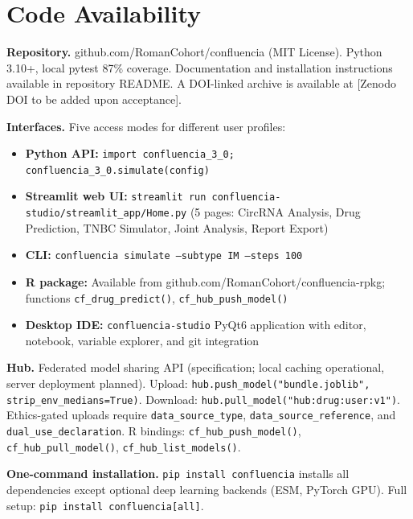 \documentclass[11pt,a4paper]{article}
\begin{document}
\section{Code Availability}

\textbf{Repository.} github.com/RomanCohort/confluencia (MIT License). Python 3.10+, local pytest 87\% coverage. Documentation and installation instructions available in repository README. A DOI-linked archive is available at [Zenodo DOI to be added upon acceptance].

\textbf{Interfaces.} Five access modes for different user profiles:
\begin{itemize}
\item \textbf{Python API:} \texttt{import confluencia\_3\_0; confluencia\_3\_0.simulate(config)}
\item \textbf{Streamlit web UI:} \texttt{streamlit run confluencia-studio/streamlit\_app/Home.py} (5 pages: CircRNA Analysis, Drug Prediction, TNBC Simulator, Joint Analysis, Report Export)
\item \textbf{CLI:} \texttt{confluencia simulate --subtype IM --steps 100}
\item \textbf{R package:} Available from github.com/RomanCohort/confluencia-rpkg; functions \texttt{cf\_drug\_predict()}, \texttt{cf\_hub\_push\_model()}
\item \textbf{Desktop IDE:} \texttt{confluencia-studio} PyQt6 application with editor, notebook, variable explorer, and git integration
\end{itemize}

\textbf{Hub.} Federated model sharing API (specification; local caching operational, server deployment planned). Upload: \texttt{hub.push\_model("bundle.joblib", strip\_env\_medians=True)}. Download: \texttt{hub.pull\_model("hub:drug:user:v1")}. Ethics-gated uploads require \texttt{data\_source\_type}, \texttt{data\_source\_reference}, and \texttt{dual\_use\_declaration}. R bindings: \texttt{cf\_hub\_push\_model()}, \texttt{cf\_hub\_pull\_model()}, \texttt{cf\_hub\_list\_models()}.

\textbf{One-command installation.} \texttt{pip install confluencia} installs all dependencies except optional deep learning backends (ESM, PyTorch GPU). Full setup: \texttt{pip install confluencia[all]}.

\end{document}
